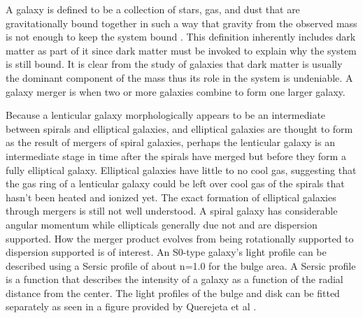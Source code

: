 \documentclass[fleqn,usenatbib]{mnras}
\begin{document}
A galaxy is defined to be a collection of stars, gas, and dust that are gravitationally bound together in such a way that gravity from the observed mass is not enough to keep the system bound \citep{Willman_2012}. This definition inherently includes dark matter as part of it since dark matter must be invoked to explain why the system is still bound. It is clear from the study of galaxies that dark matter is usually the dominant component of the mass thus its role in the system is undeniable. A galaxy merger is when two or more galaxies combine to form one larger galaxy.

Because a lenticular galaxy morphologically appears to be an intermediate between spirals and elliptical galaxies, and elliptical galaxies are thought to form as the result of mergers of spiral galaxies, perhaps the lenticular galaxy is an intermediate stage in time after the spirals have merged but before they form a fully elliptical galaxy\citep{Cox_2006}. Elliptical galaxies have little to no cool gas, suggesting that the gas ring of a lenticular galaxy could be left over cool gas of the spirals that hasn’t been heated and ionized yet. The exact formation of elliptical galaxies through mergers is still not well understood. A spiral galaxy has considerable angular momentum while ellipticals generally due not and are dispersion supported\citep{Cox_2006}. How the merger product evolves from being rotationally supported to dispersion supported is of interest.
 An S0-type galaxy's light profile can be described using a Sersic profile of about n=1.0 for the bulge area\citep{Querejeta_2015}. A Sersic profile is a function that describes the intensity of a galaxy as a function of the radial distance from the center. The light profiles of the bulge and disk can be fitted separately as seen in a figure provided by Querejeta et al \citep{Querejeta_2015}.
\end{document}

